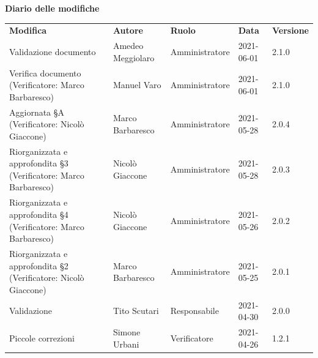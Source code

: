 \documentclass[a4paper]{article}
\begin{document}
\begin{center}

    \textbf{\Large Diario delle modifiche}\\
    \vspace{10px}
    \begin{table}[h!]
        \centering
        \renewcommand{\arraystretch}{1.8}
        \begin{tabular}{p{160px} p{86px} p{70px} p{60px} p{45px}}
            \rowcolor{logo!70} \textbf{Modifica}                                       & \textbf{Autore}                             & \textbf{Ruolo} & \textbf{Data} & \textbf{Versione} \\
            Validazione documento                                                      & Amedeo Meggiolaro                           & Amministratore & 2021-06-01    & 2.1.0             \\
            Verifica documento \newline (Verificatore: Marco Barbaresco)               & Manuel Varo                                 & Amministratore & 2021-06-01    & 2.1.0             \\
            Aggiornata \S A \newline (Verificatore: Nicolò Giaccone)                   & Marco Barbaresco                            & Amministratore & 2021-05-28    & 2.0.4             \\
            Riorganizzata e approfondita \S3 \newline (Verificatore: Marco Barbaresco) & Nicolò Giaccone                             & Amministratore & 2021-05-28    & 2.0.3             \\
            Riorganizzata e approfondita \S4 \newline (Verificatore: Marco Barbaresco) & Nicolò Giaccone                             & Amministratore & 2021-05-26    & 2.0.2             \\
            Riorganizzata e approfondita \S2 \newline (Verificatore: Nicolò Giaccone)  & Marco Barbaresco                            & Amministratore & 2021-05-25    & 2.0.1             \\
            Validazione                                                                & Tito Scutari                                & Responsabile   & 2021-04-30    & 2.0.0             \\
            Piccole correzioni                                                         & Simone Urbani                               & Verificatore   & 2021-04-26    & 1.2.1             \\

\end{tabular}
\end{table}
\end{center}
\end{document}

